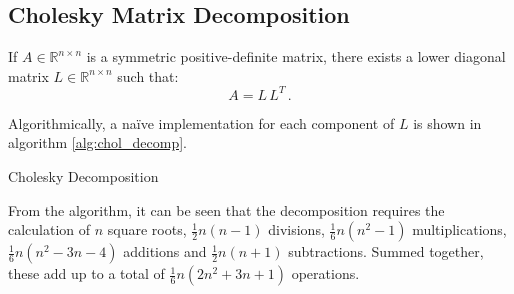 \subsection{Cholesky Matrix Decomposition} \label{add:cholesky_decomp}
If $A\in\mathbb{R}^{n\times n}$ is a symmetric positive-definite matrix, there exists a lower diagonal matrix $L\in\mathbb{R}^{n\times n}$ such that:
    \begin{equation*}
        A = L\,L^T\,.
    \end{equation*}

Algorithmically, a na\"ive implementation for each component of $L$ is shown in algorithm \ref{alg:chol_decomp}.
    \begin{algorithm}
        \caption{Cholesky Decomposition}
        \label{alg:chol_decomp}
        \SetAlgoLined
        \DontPrintSemicolon
    \end{algorithm}

From the algorithm, it can be seen that the decomposition requires the calculation of $n$ square roots, $\frac{1}{2}n(n-1)$ divisions, $\frac{1}{6}n(n^2 - 1)$ multiplications, $\frac{1}{6}n(n^2 - 3n - 4)$ additions and $\frac{1}{2}n(n + 1)$ subtractions.
Summed together, these add up to a total of $\frac{1}{6}n(2n^2 + 3n + 1)$ operations.